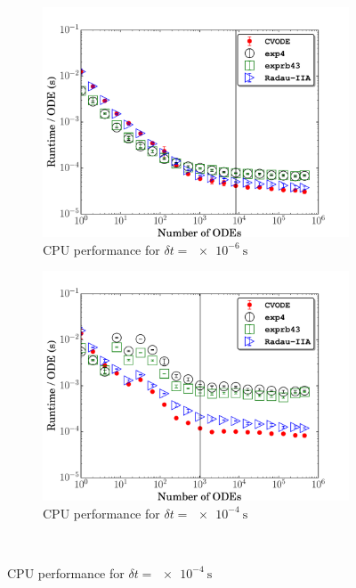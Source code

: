 \documentclass[final,twocolumn]{elsarticle}
\begin{document}
\begin{figure}[htb]
  \ifmeasure
  \fontsize{8pt}{10pt}\selectfont
  \fi
  \centering
  \begin{subfigure}{0.49\textwidth}
      \includegraphics[width=\linewidth]{CH4_1e-06_cpu.pdf}
      \caption{CPU performance for $\delta t = \SI{e-6}{\second}$}
      \label{F:ch4_cpu_perf_small}
  \end{subfigure}
  \begin{subfigure}{0.49\textwidth}
      \includegraphics[width=\linewidth]{CH4_1e-04_cpu.pdf}
      \caption{CPU performance for $\delta t = \SI{e-4}{\second}$}
      \label{F:ch4_cpu_perf_large}
  \end{subfigure}\\

\end{figure}
\end{document}
